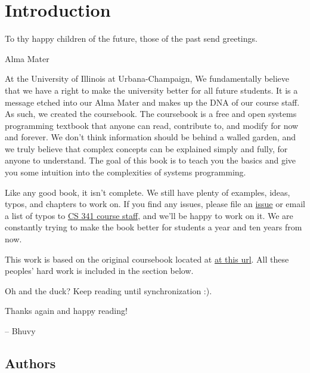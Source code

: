 \chapter{Introduction}

\epigraph{To thy happy children of the future, those of the past send greetings.}{Alma Mater}

At the University of Illinois at Urbana-Champaign, We fundamentally believe that we have a right to make the university better for all future students.
It is a message etched into our Alma Mater and makes up the DNA of our course staff.
As such, we created the coursebook.
The coursebook is a free and open systems programming textbook that anyone can read, contribute to, and modify for now and forever.
We don't think information should be behind a walled garden, and we truly believe that complex concepts can be explained simply and fully, for anyone to understand.
The goal of this book is to teach you the basics and give you some intuition into the complexities of systems programming.

Like any good book, it isn't complete.
We still have plenty of examples, ideas, typos, and chapters to work on.
If you find any issues, please file an \href{https://github.com/illinois-cs241/coursebook/issues}{issue} or email a list of typos to \href{http://cs341.cs.illinois.edu/staff}{CS 341 course staff}, and we'll be happy to work on it.
We are constantly trying to make the book better for students a year and ten years from now.

This work is based on the original coursebook located at \href{https://github.com/angrave/SystemProgramming/wiki}{at this url}.
All these peoples' hard work is included in the section below.

Oh and the duck? Keep reading until synchronization :).

Thanks again and happy reading!

-- Bhuvy

\section{Authors}



